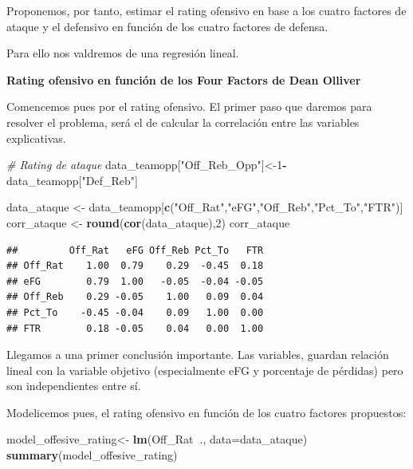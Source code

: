 \documentclass[
]{article}
\newenvironment{Shaded}{\begin{snugshade}}{\end{snugshade}}
\newcommand{\CommentTok}[1]{\textcolor[rgb]{0.56,0.35,0.01}{\textit{#1}}}
\newcommand{\DataTypeTok}[1]{\textcolor[rgb]{0.13,0.29,0.53}{#1}}
\newcommand{\DecValTok}[1]{\textcolor[rgb]{0.00,0.00,0.81}{#1}}
\newcommand{\KeywordTok}[1]{\textcolor[rgb]{0.13,0.29,0.53}{\textbf{#1}}}
\newcommand{\NormalTok}[1]{#1}
\newcommand{\OperatorTok}[1]{\textcolor[rgb]{0.81,0.36,0.00}{\textbf{#1}}}
\newcommand{\StringTok}[1]{\textcolor[rgb]{0.31,0.60,0.02}{#1}}
\begin{document}
Proponemos, por tanto, estimar el rating ofensivo en base a los cuatro
factores de ataque y el defensivo en función de los cuatro factores de
defensa.

Para ello nos valdremos de una regresión lineal.

\textbf{Rating ofensivo en función de los Four Factors de Dean Olliver}

Comencemos pues por el rating ofensivo. El primer paso que daremos para
resolver el problema, será el de calcular la correlación entre las
variables explicativas.

\begin{Shaded}
\begin{Highlighting}[]
\CommentTok{# Rating de ataque}
\NormalTok{data_teamopp[}\StringTok{"Off_Reb_Opp"}\NormalTok{]<-}\DecValTok{1}\OperatorTok{-}\NormalTok{data_teamopp[}\StringTok{"Def_Reb"}\NormalTok{]}

\NormalTok{data_ataque <-}\StringTok{ }\NormalTok{data_teamopp[}\KeywordTok{c}\NormalTok{(}\StringTok{"Off_Rat"}\NormalTok{,}\StringTok{"eFG"}\NormalTok{,}\StringTok{"Off_Reb"}\NormalTok{,}\StringTok{"Pct_To"}\NormalTok{,}\StringTok{"FTR"}\NormalTok{)]}
\NormalTok{corr_ataque <-}\StringTok{ }\KeywordTok{round}\NormalTok{(}\KeywordTok{cor}\NormalTok{(data_ataque),}\DecValTok{2}\NormalTok{)}
\NormalTok{corr_ataque}
\end{Highlighting}
\end{Shaded}

\begin{verbatim}
##         Off_Rat   eFG Off_Reb Pct_To   FTR
## Off_Rat    1.00  0.79    0.29  -0.45  0.18
## eFG        0.79  1.00   -0.05  -0.04 -0.05
## Off_Reb    0.29 -0.05    1.00   0.09  0.04
## Pct_To    -0.45 -0.04    0.09   1.00  0.00
## FTR        0.18 -0.05    0.04   0.00  1.00
\end{verbatim}

Llegamos a una primer conclusión importante. Las variables, guardan
relación lineal con la variable objetivo (especialmente eFG y porcentaje
de pérdidas) pero son independientes entre sí.

Modelicemos pues, el rating ofensivo en función de los cuatro factores
propuestos:

\begin{Shaded}
\begin{Highlighting}[]
\NormalTok{model_offesive_rating<-}\StringTok{ }\KeywordTok{lm}\NormalTok{(Off_Rat}\OperatorTok{~}\NormalTok{., }\DataTypeTok{data=}\NormalTok{data_ataque)}
\KeywordTok{summary}\NormalTok{(model_offesive_rating)}
\end{Highlighting}
\end{Shaded}
\end{document}
